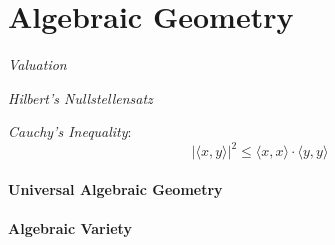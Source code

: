 \part{Algebraic Geometry}\label{sec:algebraic_geometry}

\emph{Valuation}

\emph{Hilbert's Nullstellensatz}

\emph{Cauchy's Inequality}:
\[
    |\langle x,y \rangle|^2 \leq \langle x,x \rangle \cdot \langle
    y,y \rangle
\]



\subsection{Universal Algebraic Geometry}



\subsection{Algebraic Variety}\label{sec:algebraic_variety}
